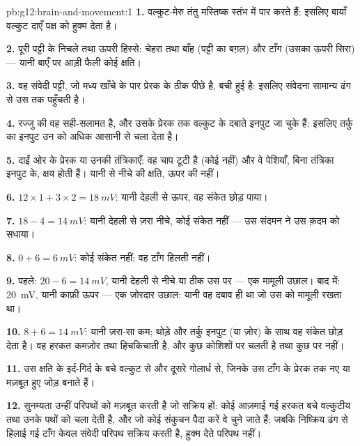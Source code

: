 \begin{solution}{pb:g12:brain-and-movement:1}
\textbf{1.} वल्कुट-मेरु तंतु मस्तिष्क स्तंभ में पार करते हैं: इसलिए बायाँ
वल्कुट दाएँ पक्ष को हुक्म देता है।

\textbf{2.} पूरी पट्टी के निचले तथा ऊपरी हिस्से: चेहरा तथा बाँह (पट्टी का
बग़ल) और टाँग (उसका ऊपरी सिरा) --- यानी बाएँ  पर आड़ी फैली
कोई क्षति।

\textbf{3.} वह संवेदी पट्टी, जो मध्य खाँचे के पार प्रेरक के ठीक पीछे है, बची
हुई है: इसलिए संवेदना सामान्य ढंग से उस तक पहुँचती है।

\textbf{4.} रज्जु की वह  सही-सलामत है, और उसके प्रेरक 
तक वल्कुट के दबाते इनपुट जा चुके हैं: इसलिए तर्कु का इनपुट उन  को
अधिक आसानी से चला देता है।

\textbf{5.} दाईं ओर के प्रेरक  या उनकी तंत्रिकाएँ: वह चाप टूटी है
(कोई  नहीं) और वे पेशियाँ, बिना तंत्रिका इनपुट के, क्षय होती हैं।
यानी  से नीचे की क्षति, ऊपर की नहीं।

\textbf{6.} $12 \times 1 + 3 \times 2 = \qty{18}{mV}$: यानी देहली से ऊपर,
वह संकेत छोड़ पाया।

\textbf{7.} $18 - 4 = \qty{14}{mV}$: यानी देहली से ज़रा नीचे, कोई संकेत नहीं
--- उस संदमन ने उस क़दम को सधाया।

\textbf{8.} $0 + 6 = \qty{6}{mV}$: कोई संकेत नहीं; वह टाँग हिलती नहीं।

\textbf{9.} पहले: $20 - 6 = \qty{14}{mV}$, यानी देहली से नीचे या ठीक उस पर
--- एक मामूली उछाल। बाद में: \qty{20}{mV}, यानी काफ़ी ऊपर --- एक ज़ोरदार
उछाल: यानी वह दबाव ही था जो उस  को मामूली रखता था।

\textbf{10.} $8 + 6 = \qty{14}{mV}$: यानी ज़रा-सा कम; थोड़े और तर्कु इनपुट
(या ज़ोर) के साथ वह संकेत छोड़ देता है। वह हरकत कमज़ोर तथा हिचकिचाती है, और
कुछ कोशिशों पर चलती है तथा कुछ पर नहीं।

\textbf{11.} उस क्षति के इर्द-गिर्द के बचे वल्कुट से और दूसरे गोलार्ध से,
जिनके  उस टाँग के प्रेरक  तक नए या मज़बूत हुए जोड़ बनाते
हैं।

\textbf{12.} सुनम्यता उन्हीं परिपथों को मज़बूत करती है जो सक्रिय हों: कोई
आज़माई गई हरकत बचे वल्कुटीय  तथा उनके पथों को चला देती है, और जो
कोई संकुचन पैदा करें वे चुने जाते हैं; जबकि निष्क्रिय ढंग से हिलाई गई टाँग
केवल संवेदी परिपथ सक्रिय करती है, हुक्म देते परिपथ नहीं।


\end{solution}
